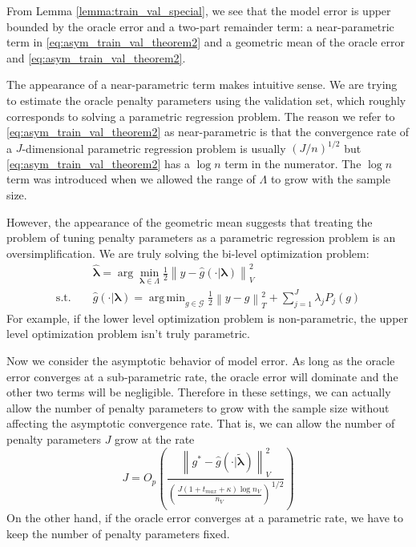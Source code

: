 \documentclass[12pt]{article}
\DeclareMathOperator*{\argmin}{arg\,min}
\begin{document}
From Lemma \ref{lemma:train_val_special}, we see that the model error is upper bounded by the oracle error and a two-part remainder term: a near-parametric term in \ref{eq:asym_train_val_theorem2} and a geometric mean of the oracle error and \ref{eq:asym_train_val_theorem2}.

The appearance of a near-parametric term makes intuitive sense. We are trying to estimate the oracle penalty parameters using the validation set, which roughly corresponds to solving a parametric regression problem. The reason we refer to \ref{eq:asym_train_val_theorem2} as near-parametric is that the convergence rate of a $J$-dimensional parametric regression problem is usually $(J/n)^{1/2}$ but \ref{eq:asym_train_val_theorem2} has a $\log n$ term in the numerator. The $\log n$ term was introduced when we allowed the range of $\Lambda$ to grow with the sample size.

However, the appearance of the geometric mean suggests that treating the problem of tuning penalty parameters as a parametric regression problem is an oversimplification. We are truly solving the bi-level optimization problem:
\begin{eqnarray}
\label{eq:bilevel}
&& \hat{\boldsymbol \lambda} = \arg\min_{\boldsymbol{\lambda} \in\Lambda} \frac{1}{2} \left \| y-\hat{g}(\cdot | \boldsymbol \lambda) \right \|_{V}^{2}\\
\text{s.t. } && \hat{g}(\cdot | \boldsymbol \lambda) = \argmin_{g\in \mathcal{G}} \frac{1}{2} \left \|y -  g \right \|_T^2 + \sum_{j=1}^J \lambda_j P_j(g)
\end{eqnarray}
For example, if the lower level optimization problem is non-parametric, the upper level optimization problem isn't truly parametric.

Now we consider the asymptotic behavior of model error. As long as the oracle error converges at a sub-parametric rate, the oracle error will dominate and the other two terms will be negligible. Therefore in these settings, we can actually allow the number of penalty parameters to grow with the sample size without affecting the asymptotic convergence rate. That is, we can allow the number of penalty parameters $J$ grow at the rate
\begin{equation}
J = O_p\left (
\frac{\left \| g^*-\hat{g}(\cdot | \tilde{\boldsymbol {\lambda}}) \right \|_{V}^{2}}
{\left(\frac{J\left(1+t_{max}+\kappa\right)\log n_{V}}{n_{V}}\right)^{1/2}}
\right)
\end{equation}
On the other hand, if the oracle error converges at a parametric rate, we have to keep the number of penalty parameters fixed.
\end{document}
